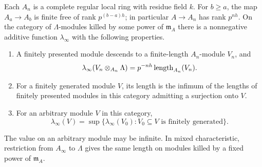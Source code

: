 \begin{lemma}\label{len:tower}
Each $A_n$ is a complete regular local ring with residue field $k$.
For $b\geq a$, the map $A_a\to A_b$ is finite free of rank
$p^{(b-a)h}$; in particular $A\to A_n$ has rank $p^{nh}$.
On the category of $\Lambda$-modules killed by some power of
$\mathfrak m_A$ there is a nonnegative additive function
$\lambda_\infty$ with the following properties.
\begin{enumerate}
\item A finitely presented module descends to a finite-length
      $A_n$-module $V_n$, and
      \begin{equation}\label{len:finite-stage}
       \lambda_\infty(V_n\otimes_{A_n}\Lambda)
                      =p^{-nh}\operatorname{length}_{A_n}(V_n).
      \end{equation}
\item For a finitely generated module $V$, its length is the infimum
      of the lengths of finitely presented modules in this category
      admitting a surjection onto $V$.
\item For an arbitrary module $V$ in this category,
      \begin{equation}\label{len:supremum}
       \lambda_\infty(V)=
       \sup\{\lambda_\infty(V_0):V_0\subseteq V
                                  \text{ is finitely generated}\}.
      \end{equation}
\end{enumerate}
The value on an arbitrary module may be infinite.  In mixed
characteristic, restriction from $A_\infty$ to $\Lambda$ gives the same
length on modules killed by a fixed power of $\mathfrak m_A$.
\end{lemma}

